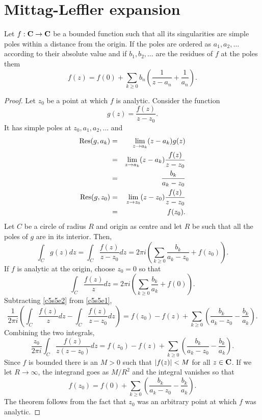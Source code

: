 \section{Mittag-Leffler expansion}\label{c5s5}
\begin{thm}\label{c5s5t1}
Let $f: \mathbf{C} \rightarrow \mathbf{C}$ be a bounded function such that all its singularities 
are simple poles within a distance  from the origin. If the poles are ordered as
$a_1, a_2, \ldots$ according to their absolute value and if $b_1, b_2, \ldots$ 
are the residues of $f$ at the poles them
\[
f(z) = f(0) + \sum_{k \ge 0}b_n\left(\frac{1}{z - a_n} + \frac{1}{a_n}\right).
\]
\end{thm}
\begin{proof}
Let $z_0$ be a point at which $f$ is analytic. Consider the function
\[
g(z) = \frac{f(z)}{z - z_0}.
\]
It has simple poles at $z_0, a_1, a_2, \ldots$ and
\begin{eqnarray*}
\operatorname{Res}(g, a_k) &=& \lim_{z \rightarrow a_k}(z - a_k)g(z) \\
 &=& \lim_{z \rightarrow a_k}(z - a_k)\frac{f(z)}{z - z_0} \\
 &=& \frac{b_k}{a_k - z_0} \\
\operatorname{Res}(g, z_0) &=& \lim_{z \rightarrow z_0}(z - z_0)\frac{f(z)}{z - z_0} \\
 &=& f(z_0).
\end{eqnarray*}
Let $C$ be a circle of radius $R$ and origin as centre and let $R$ be such that
all the poles of $g$ are in its interior. Then,
\begin{equation}\label{c5s5e1}
\int_C g(z)dz = \int_C\frac{f(z)}{z - z_0}dz
= 2\pi i\left(\sum_{k \ge 0}\frac{b_k}{a_k - z_0} + f(z_0)\right).
\end{equation}
If $f$ is analytic at the origin, choose $z_0 = 0$ so that
\begin{equation}\label{c5s5e2}
\int_C\frac{f(z)}{z}dz = 2\pi i\left(\sum_{k \ge 0}\frac{b_k}{a_k} + f(0)\right).
\end{equation}
Subtracting \eqref{c5s5e2} from \eqref{c5s5e1},
\[
\frac{1}{2\pi i}\left(\int_C\frac{f(z)}{z}dz - \int_C\frac{f(z)}{z - z_0}dz\right) = 
f(z_0) - f(z) + \sum_{k \ge 0}\left(\frac{b_k}{a_k - z_0} - \frac{b_k}{a_k}\right).
\]
Combining the two integrals,
\[
\frac{z_0}{2\pi i}\int_C\frac{f(z)}{z(z - z_0)}dz =
f(z_0) - f(z) + \sum_{k \ge 0}\left(\frac{b_k}{a_k - z_0} - \frac{b_k}{a_k}\right).
\]
Since $f$ is bounded there is an $M > 0$ such that $\left\vert{f(z)}\right\vert < M$ for all $z \in \mathbf{C}$.
If we let $R \rightarrow \infty$, the integrand goes as $M/R^2$ and the integral vanishes
so that
\[
f(z_0) = f(0) + \sum_{k \ge 0}\left(\frac{b_k}{a_k - z_0} - \frac{b_k}{a_k}\right).
\]
The theorem follows from the fact that $z_0$ was an arbitrary point at which $f$
was analytic.
\end{proof}

